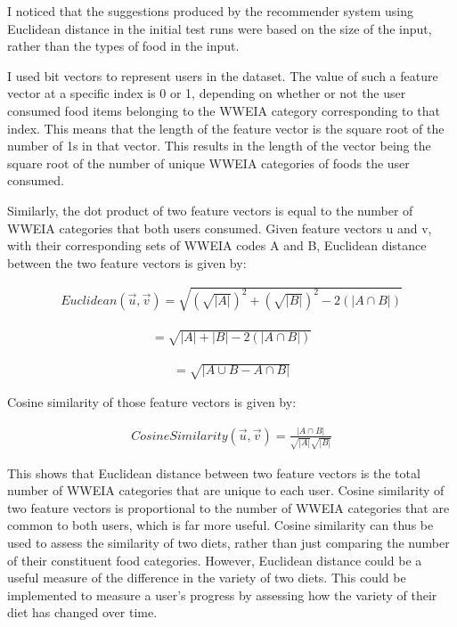 \documentclass{article}
\begin{document}
\bigskip 
\noindent I noticed that the suggestions produced by the recommender system using Euclidean distance in the initial test runs were based on the size of the input, rather than the types of food in the input. 

\bigskip
\noindent I used bit vectors to represent users in the dataset. The value of such a feature vector at a specific index is 0 or 1, depending on whether or not the user consumed food items belonging to the WWEIA category corresponding to that index. This means that the length of the feature vector is the square root of the number of 1s in that vector. This results in the length of the vector being the square root of the number of unique WWEIA categories of foods the user consumed. 

\bigskip
\noindent Similarly, the dot product of two feature vectors is equal to the number of WWEIA categories that both users consumed. Given feature vectors u and v, with their corresponding sets of WWEIA codes A and B, Euclidean distance between the two feature vectors is given by:

\begin{align*}
    Euclidean(\vec{u},\vec{v}) = \sqrt{(\sqrt{|A|})^2 + (\sqrt{|B|})^2 - 2(|A \cap B|)} 
\end{align*}

\begin{align*}
    = \sqrt{|A| + |B| - 2(|A \cap B|)} 
\end{align*}

\begin{align*}
    = \sqrt{|A \cup B - A \cap B|} 
\end{align*}

\bigskip
\noindent Cosine similarity of those feature vectors is given by: 

\begin{align*}
    Cosine Similarity (\vec{u},\vec{v}) = \frac{|A \cap B|}{\sqrt{|A|}\sqrt{|B|}}
\end{align*}

\bigskip
\noindent This shows that Euclidean distance between two feature vectors is the total number of WWEIA categories that are unique to each user. Cosine similarity of two feature vectors is proportional to the number of WWEIA categories that are common to both users, which is far more useful. Cosine similarity can thus be used to assess the similarity of two diets, rather than just comparing the number of their constituent food categories. However, Euclidean distance could be a useful measure of the difference in the variety of two diets. This could be implemented to measure a user's progress by assessing how the variety of their diet has changed over time.
\end{document}
